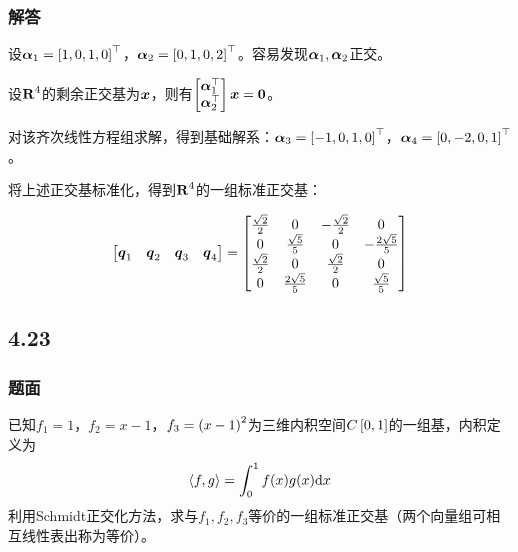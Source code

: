 \documentclass{beamer}
\begin{document}
\begin{frame}
    \frametitle{解答}
    设\(\boldsymbol{\alpha}_1=\left[ 1,0,1,0 \right]^\top\)，\(\boldsymbol{\alpha}_2=\left[ 0,1,0,2 \right]^\top\)。容易发现\(\boldsymbol{\alpha}_1,\boldsymbol{\alpha}_2\)正交。

    设\(\boldsymbol{\mathrm{R}}^4\)的剩余正交基为\(\boldsymbol{x}\)，则有\(\begin{bmatrix}\boldsymbol{\alpha}_1^\top\\\boldsymbol{\alpha}_2^\top\end{bmatrix}\boldsymbol{x}=\boldsymbol{0}\)。

    对该齐次线性方程组求解，得到基础解系：\(\boldsymbol{\alpha}_3=\left[ -1,0,1,0 \right]^\top\)，\(\boldsymbol{\alpha}_4=\left[ 0,-2,0,1 \right]^\top\)。

    将上述正交基标准化，得到\(\boldsymbol{\mathrm{R}}^4\)的一组标准正交基：

    \begin{equation*}
        \begin{bmatrix}
            \boldsymbol{q}_1 & \boldsymbol{q}_2 & \boldsymbol{q}_3 & \boldsymbol{q}_4
        \end{bmatrix}=
        \begin{bmatrix}
            \frac{\sqrt{2}}{2} & 0                   & -\frac{\sqrt{2}}{2} & 0                    \\
            0                  & \frac{\sqrt{5}}{5}  & 0                   & -\frac{2\sqrt{5}}{5} \\
            \frac{\sqrt{2}}{2} & 0                   & \frac{\sqrt{2}}{2}  & 0                    \\
            0                  & \frac{2\sqrt{5}}{5} & 0                   & \frac{\sqrt{5}}{5}
        \end{bmatrix}
    \end{equation*}
\end{frame}

\subsection*{4.23}
\begin{frame}
    \frametitle{题面}
    已知\(f_1=1\)，\(f_2=x-1\)，\(f_3=\left( x-1 \right)^2\)为三维内积空间\(C\left[ 0,1 \right]\)的一组基，内积定义为
    \begin{equation*}
        \left\langle f,g \right\rangle=\int_0^1f(x)g(x)\mathrm{d}x
    \end{equation*}
    利用Schmidt正交化方法，求与\(f_1,f_2,f_3\)等价的一组标准正交基（两个向量组可相互线性表出称为等价）。
\end{frame}
\end{document}
